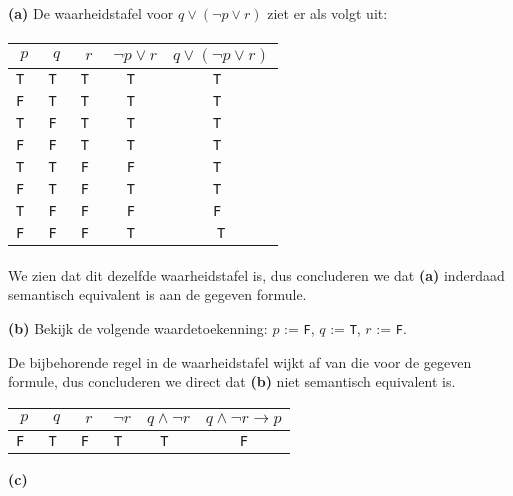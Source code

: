 \documentclass[a4paper,11pt]{article}
\begin{document}
\begin{description}

\item{\bf (a)}
De waarheidstafel voor $q \vee (\neg p \vee r)$ ziet er als volgt uit:

\paragraph{}

\begin{tabular}{c|c|c|c|c}
$p$   & $q$   & $r$   & $\neg p \vee r$ & $q \vee (\neg p \vee r)$ \\
\hline
\tt T & \tt T & \tt T & \tt T           & \tt T \\
\tt F & \tt T & \tt T & \tt T           & \tt T \\
\tt T & \tt F & \tt T & \tt T           & \tt T \\
\tt F & \tt F & \tt T & \tt T           & \tt T \\
\tt T & \tt T & \tt F & \tt F           & \tt T \\
\tt F & \tt T & \tt F & \tt T           & \tt T \\
\tt T & \tt F & \tt F & \tt F           & \tt F \\
\tt F & \tt F & \tt F & \tt T           & \tt T
\end{tabular}

\paragraph{}

We zien dat dit dezelfde waarheidstafel is, dus concluderen we dat \textbf{(a)}
inderdaad semantisch equivalent is aan de gegeven formule.

\item{\bf (b)}
Bekijk de volgende waardetoekenning: $p$ := \texttt{F}, $q$ := \texttt{T}, $r$ := \texttt{F}.

De bijbehorende regel in de waarheidstafel wijkt af van die voor de gegeven formule, dus
concluderen we direct dat \textbf{(b)} niet semantisch equivalent is.

\begin{tabular}{c|c|c|c|c|c}
$p$   & $q$   & $r$   & $\neg r$ & $q \wedge \neg r$ & $q \wedge \neg r \rightarrow p$ \\
\hline
\tt F & \tt T & \tt F & \tt T    & \tt T             & \tt F
\end{tabular}

\item{\bf (c)}


\end{description}
\end{document}
